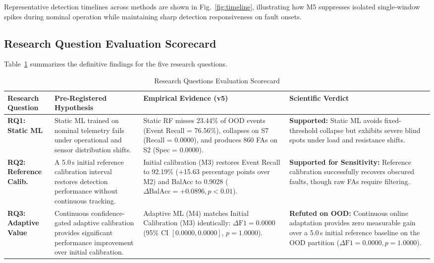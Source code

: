 \documentclass[conference]{IEEEtran}
\begin{document}
Representative detection timelines across methods are shown in Fig.~\ref{fig:timeline}, illustrating how M5 suppresses isolated single-window spikes during nominal operation while maintaining sharp detection responsiveness on fault onsets.

\subsection{Research Question Evaluation Scorecard}
Table~\ref{tab:scorecard} summarizes the definitive findings for the five research questions.

\begin{table}[!t]
\caption{Research Questions Evaluation Scorecard}
\label{tab:scorecard}
\centering
\begingroup
\scriptsize
\renewcommand{\arraystretch}{0.92}
\setlength{\tabcolsep}{3.5pt}
\begin{tabularx}{\textwidth}{@{}l>{\raggedright\arraybackslash}X>{\raggedright\arraybackslash}p{4.2cm}>{\raggedright\arraybackslash}X@{}}
\toprule
\textbf{Research Question} & \textbf{Pre-Registered Hypothesis} & \textbf{Empirical Evidence (v5)} & \textbf{Scientific Verdict} \\
\midrule
\textbf{RQ1: Static ML} & Static ML trained on nominal telemetry fails under operational and sensor distribution shifts. & Static RF misses 23.44\% of OOD events (Event Recall = 76.56\%), collapses on S7 (Recall = 0.0000), and produces 860 FAs on S2 (Spec = 0.0000). & \textbf{Supported:} Static ML avoids fixed-threshold collapse but exhibits severe blind spots under load and resistance shifts. \\
\midrule
\textbf{RQ2: Reference Calib.} & A 5.0\,s initial reference calibration interval restores detection performance without continuous tracking. & Initial calibration (M3) restores Event Recall to 92.19\% (+15.63 percentage points over M2) and BalAcc to 0.9028 ($\Delta\text{BalAcc} = +0.0896, p < 0.01$). & \textbf{Supported for Sensitivity:} Reference calibration successfully recovers obscured faults, though raw FAs require filtering. \\
\midrule
\textbf{RQ3: Adaptive Value} & Continuous confidence-gated adaptive calibration provides significant performance improvement over initial calibration. & Adaptive ML (M4) matches Initial Calibration (M3) identically: $\Delta\text{F1} = 0.0000$ (95\% CI $[0.0000, 0.0000]$, $p = 1.0000$). & \textbf{Refuted on OOD:} Continuous online adaptation provides zero measurable gain over a 5.0\,s initial reference baseline on the OOD partition ($\Delta\text{F1} = 0.0000, p = 1.0000$). \\

\end{tabularx}
\end{table}
\end{document}
